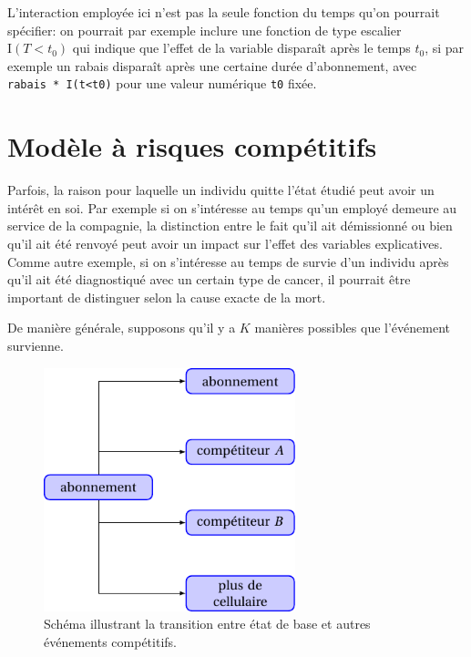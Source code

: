 \documentclass[
  11pt,
  letterpaper,
]{scrbook}
\theoremstyle{definition}
\theoremstyle{remark}
\begin{document}
L'interaction employée ici n'est pas la seule fonction du temps qu'on
pourrait spécifier: on pourrait par exemple inclure une fonction de type
escalier \(\mathrm{I}(T< t_0)\) qui indique que l'effet de la variable
disparaît après le temps \(t_0\), si par exemple un rabais disparaît
après une certaine durée d'abonnement, avec
\texttt{rabais\ *\ I(t\textless{}t0)} pour une valeur numérique
\texttt{t0} fixée.

\hypertarget{moduxe8le-uxe0-risques-compuxe9titifs}{%
\section{Modèle à risques
compétitifs}\label{moduxe8le-uxe0-risques-compuxe9titifs}}

Parfois, la raison pour laquelle un individu quitte l'état étudié peut
avoir un intérêt en soi. Par exemple si on s'intéresse au temps qu'un
employé demeure au service de la compagnie, la distinction entre le fait
qu'il ait démissionné ou bien qu'il ait été renvoyé peut avoir un impact
sur l'effet des variables explicatives. Comme autre exemple, si on
s'intéresse au temps de survie d'un individu après qu'il ait été
diagnostiqué avec un certain type de cancer, il pourrait être important
de distinguer selon la cause exacte de la mort.

De manière générale, supposons qu'il y a \(K\) manières possibles que
l'événement survienne.

\begin{figure}[ht!]

{\centering \includegraphics[width=0.65\textwidth,height=\textheight]{figures/transition_etats_modele_risque_competitifs.pdf}

}

\caption{\label{fig-transitionetat}Schéma illustrant la transition entre
état de base et autres événements compétitifs.}

\end{figure}
\end{document}
